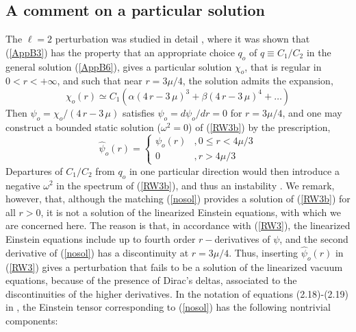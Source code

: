 \documentclass[12pt,aps,floats,showpacs,amssymb,tightenlines]{revtex4}
\renewcommand{\a}{\alpha}
\renewcommand{\b}{\beta}
\newcommand{\m}{\mu}
\newcommand{\w}{\omega}
\begin{document}
\subsection{A comment on a particular solution} \label{ns}

The $\ell = 2$ perturbation was studied in detail \cite{ghi}, where
it was shown  that (\ref{AppB3}) has the property that an appropriate choice $q_o$ of
 $q \equiv C_1/C_2$ in the general solution (\ref{AppB6}), gives a particular solution
 $\chi_o$, that is regular in $0 < r < +\infty$, and such that near $ r = 3 \mu/4$,
 the solution admits the expansion,
\begin{equation}
\label{RW15}
 \chi_o(r) \simeq C_1 \left( \a \left( 4\,r-3\,\mu \right) ^{3}+ \b
  \left( 4\,r-3\,\mu \right) ^{4}+ \dots \right)
\end{equation}
Then $\psi_o= \chi_o/( 4\,r-3\,\mu)$ satisfies $\psi_o=d\psi_o/dr=0$ for $r=3 \mu/4$, and one may construct a
bounded static solution ($\w^2=0$) of  (\ref{RW3b})  by the prescription,
\begin{equation} \label{nosol}
\hat \psi_o (r) = \begin{cases} \psi_o(r) & , 0 \leq r < 4\m/3 \\
0 & , r > 4\m/3 \end{cases}
\end{equation}
Departures of $C_1/C_2$ from $q_o$ in one particular direction would
then introduce a negative $\w^2$ in the spectrum of (\ref{RW3b}),
and thus an instability \cite{ghi}. We remark, however, that, although the
matching (\ref{nosol}) provides a solution
  of (\ref{RW3b}) for all $r > 0$, it is not a
  solution of the linearized Einstein equations, with which we are concerned here.
  The reason is that, in accordance with
(\ref{RW3}), the linearized Einstein equations include up to fourth
order $r-$derivatives of $\psi$, and   the second derivative of
(\ref{nosol}) has a discontinuity at $r=3 \mu /4$.
 Thus, inserting $\hat
\psi_o(r)$ in
 (\ref{RW3}) gives a perturbation that fails to be
 a solution of the linearized vacuum equations, because of the presence of Dirac's deltas,
  associated to the discontinuities of the higher derivatives. In
  the notation of equations (2.18)-(2.19) in \cite{ghi}, the Einstein
  tensor corresponding to (\ref{nosol})  has the following nontrivial
  components:
\end{document}

